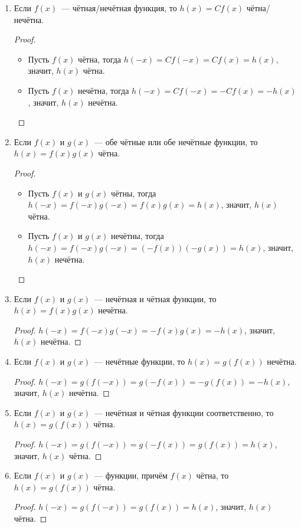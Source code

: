 \begin{enumerate}
	\item Если $f(x)$~--- чётная/нечётная функция, то $h(x) = C f(x)$ чётна/нечётна.
	\begin{proof}
	\begin{itemize}
		\item Пусть $f(x)$ чётна, тогда $h(-x) = C f(-x) = C f(x) = h(x)$, значит, $h(x)$ чётна.
		\item Пусть $f(x)$ нечётна, тогда $h(-x) = C f(-x) = -C f(x) = -h(x)$, значит, $h(x)$ нечётна.
	\end{itemize}
	\end{proof}
	
	\item Если $f(x)$ и $g(x)$~--- обе чётные или обе нечётные функции, то $h(x) = f(x)g(x)$ чётна.
	\begin{proof}
	\begin{itemize}
		\item Пусть $f(x)$ и $g(x)$ чётны, тогда $h(-x) = f(-x)g(-x) = f(x)g(x) = h(x)$, значит, $h(x)$ чётна.
		\item Пусть $f(x)$ и $g(x)$ нечётны, тогда $h(-x) = f(-x)g(-x) = (-f(x)) (-g(x)) = h(x)$, значит, $h(x)$ нечётна.
	\end{itemize}
	\end{proof}
	
	\item Если $f(x)$ и $g(x)$~--- нечётная и чётная функции, то $h(x) = f(x)g(x)$ нечётна.
	\begin{proof}
	$h(-x) = f(-x)g(-x) = -f(x)g(x) = -h(x)$, значит, $h(x)$ нечётна.
	\end{proof}
	
	\item Если $f(x)$ и $g(x)$~--- нечётные функции, то $h(x) = g(f(x))$ нечётна.
	\begin{proof}
	$h(-x) = g(f(-x)) = g(-f(x)) = -g(f(x)) = -h(x)$, значит, $h(x)$ нечётна.
	\end{proof}
	
	\item Если $f(x)$ и $g(x)$~--- нечётная и чётная функции соответственно, то $h(x) = g(f(x))$ чётна.
	\begin{proof}
	$h(-x) = g(f(-x)) = g(-f(x)) = g(f(x)) = h(x)$, значит, $h(x)$ чётна.
	\end{proof}
	
	\item Если $f(x)$ и $g(x)$~--- функции, причём $f(x)$ чётна, то $h(x) = g(f(x))$ чётна.
	\begin{proof}
	$h(-x) = g(f(-x)) = g(f(x)) = h(x)$, значит, $h(x)$ чётна.
	\end{proof}
\end{enumerate}

